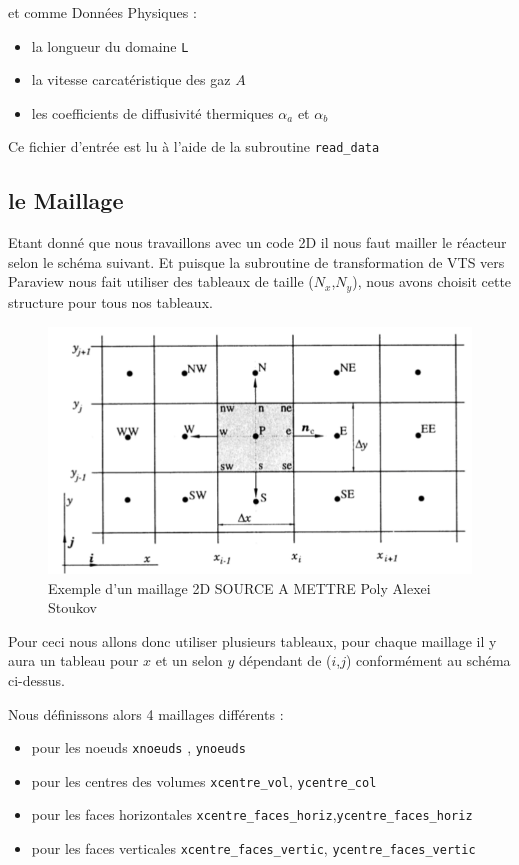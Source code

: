\documentclass[a4paper,oneside]{article}
\makeatletter
\def\bigcenter{\trivlist \bigcentering\item\relax}
\def\bigcentering{\let\\\@centercr\rightskip\@bigflushglue%
\leftskip\@bigflushglue
\parindent\z@\parfillskip\z@skip}
\makeatother
\begin{document}
et comme Données Physiques :
\begin{itemize}
	\item la longueur du domaine \verb?L?
	\item la vitesse carcatéristique des gaz $A$
	\item les coefficients de diffusivité thermiques $\alpha_a$ et $\alpha_b$
\end{itemize}

Ce fichier d'entrée est lu à l'aide de la subroutine \verb?read_data?



\subsection{le Maillage}
Etant donné que nous travaillons avec un code 2D il nous faut mailler le réacteur selon le schéma suivant.
Et puisque la subroutine de transformation de VTS vers Paraview nous fait utiliser des tableaux de taille ($N_x$,$N_y$), nous avons choisit cette structure pour tous nos tableaux.

\begin{figure}[h!]
\bigcenter
\includegraphics[scale=0.5]{Champ_Vitesse_Maillage/MaillageTheorique.PNG}
\caption{Exemple d'un maillage 2D SOURCE A METTRE Poly Alexei Stoukov}
\end{figure}

Pour ceci nous allons donc utiliser plusieurs tableaux, pour chaque maillage il y aura un tableau pour $x$ et un selon $y$ dépendant de ($i$,$j$) conformément au schéma ci-dessus.

Nous définissons alors 4 maillages différents :
\begin{itemize}
	\item pour les noeuds \verb?xnoeuds? , \verb?ynoeuds?
	\item pour les centres des volumes \verb?xcentre_vol?, \verb?ycentre_col?
	\item pour les faces horizontales \verb?xcentre_faces_horiz?,\verb?ycentre_faces_horiz?
	\item pour les faces verticales \verb?xcentre_faces_vertic?, \verb?ycentre_faces_vertic?
\end{itemize}
\end{document}
